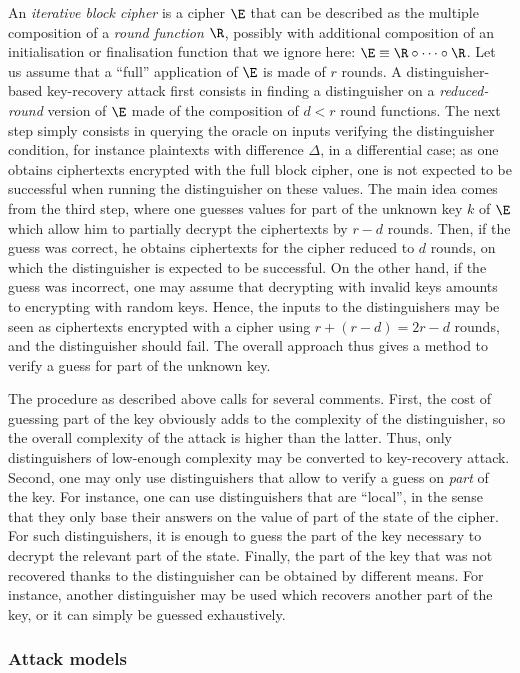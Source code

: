 An \emph{iterative block cipher} is a cipher $\E$ that can be described as the multiple composition of a \emph{round function} $\R$, possibly with additional
composition of an initialisation or finalisation function that we ignore here: $\E \equiv \R \circ \cdots \circ \R$. Let us assume that a ``full''
application of $\E$ is made of $r$ rounds. A distinguisher-based key-recovery attack first consists in finding a distinguisher on
a \emph{reduced-round} version of $\E$ made of the composition of $d < r$ round functions. The next step simply consists in querying the oracle on inputs verifying the distinguisher condition, for instance
plaintexts with difference $\Delta$, in a differential case;
as one obtains ciphertexts encrypted with the full block cipher, one is not expected to be successful when running the distinguisher
on these values. The main idea comes from the third step, where one guesses values for part of the unknown key $k$ of $\E$ which allow him
to partially decrypt the ciphertexts by $r-d$ rounds. Then, if
the guess was correct, he obtains ciphertexts for the cipher reduced to $d$ rounds, on which the distinguisher is expected to be successful.
On the other hand, if the guess was incorrect, one may assume that decrypting with invalid keys amounts to encrypting with random keys. Hence,
the inputs to the distinguishers may be seen as ciphertexts encrypted with a cipher using $r + (r-d) = 2r -d$ rounds, and the distinguisher should fail.
The overall approach thus gives a method to verify a guess for part of the unknown key.

The procedure as described above calls for several comments.
First, the cost of guessing part of the key obviously adds to the complexity of the distinguisher, so the overall complexity of the attack
is higher than the latter. Thus, only distinguishers of low-enough complexity may be converted to key-recovery attack.
Second, 
one may only use distinguishers that allow to verify a guess on \emph{part} of the key.
For instance, one can use
distinguishers that are ``local'', in the sense that they only base their answers on the value of part of the state of the cipher.
For such distinguishers, it is enough to guess the part of the key necessary to decrypt the relevant part of the state.
Finally, the part of the key that was not recovered thanks
to the distinguisher can be obtained by different means. For instance, another distinguisher may be
used which recovers another part of the key, or it can simply be guessed exhaustively.


\subsubsection{Attack models}

